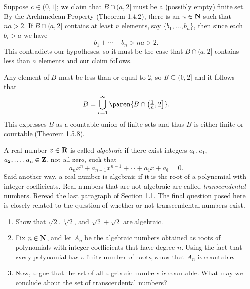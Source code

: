 \documentclass{lew98_solutions}
\begin{document}
\begin{solution}
    Suppose \( a \in (0, 1] \); we claim that \( B \cap (a, 2] \) must be a (possibly empty) finite set. By the Archimedean Property (Theorem 1.4.2), there is an \( n \in \mathbf{N} \) such that \( na > 2 \). If \( B \cap (a, 2] \) contains at least \( n \) elements, say \( \{ b_1, \ldots, b_n \} \), then since each \( b_i > a \) we have
    \[
        b_1 + \cdots + b_n > na > 2.
    \]
    This contradicts our hypotheses, so it must be the case that \( B \cap (a, 2] \) contains less than \( n \) elements and our claim follows.

    Any element of \( B \) must be less than or equal to 2, so \( B \subseteq (0, 2] \) and it follows that
    \[
        B = \bigcup_{n=1}^{\infty} \paren{ B \cap \left( \tfrac{1}{n}, 2 \right] }.
    \]
    This expresses \( B \) as a countable union of finite sets and thus \( B \) is either finite or countable (Theorem 1.5.8).
\end{solution}

\begin{exercise}
\label{ex:1.5.9}
    A real number \( x \in \mathbf{R} \) is called \textit{algebraic} if there exist integers \( a_0, a_1, \) \( a_2, \ldots, a_n \in \mathbf{Z} \), not all zero, such that
    \[
        a_n x^n + a_{n-1} x^{n-1} + \cdots + a_1 x + a_0 = 0.
    \]
    Said another way, a real number is algebraic if it is the root of a polynomial with integer coefficients. Real numbers that are not algebraic are called \textit{transcendental} numbers. Reread the last paragraph of Section 1.1. The final question posed here is closely related to the question of whether or not transcendental numbers exist.
    \begin{enumerate}
        \item Show that \( \sqrt{2}, \sqrt[3]{2} \), and \( \sqrt{3} + \sqrt{2} \) are algebraic.

        \item Fix \( n \in \mathbf{N} \), and let \( A_n \) be the algebraic numbers obtained as roots of polynomials with integer coefficients that have degree \( n \). Using the fact that every polynomial has a finite number of roots, show that \( A_n \) is countable.

        \item Now, argue that the set of all algebraic numbers is countable. What may we conclude about the set of transcendental numbers?
    \end{enumerate}
\end{exercise}
\end{document}

